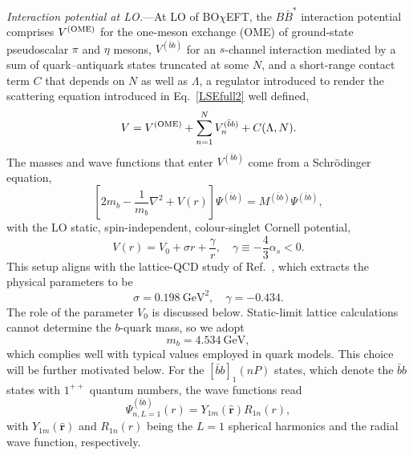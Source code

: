 \documentclass[aps,prl,showpacs,amsmath,twocolumn,superscriptaddress,floatfix,nofootinbib,notitlepage]{revtex4-2}
\newcommand{\bbnP}{[\bar{b}b]_1(nP)}
\newcommand{\psibb}{\Psi^{(\bar{b}b)}}
\newcommand{\Mbb}{M^{(\bar{b}b)}}
\newcommand{\ver}{{\bm r}}
\newcommand{\be}{\begin{equation}}
\newcommand{\ee}{\end{equation}}
\newcommand{\BOchiEFT}{BO$\chi$EFT\xspace}
\newcommand{\VQQ}{V^{(\bar{b}b)}}
\newcommand{\VOME}{V^{\rm (OME)}}
\begin{document}
{\it Interaction potential at LO.}---At LO of \BOchiEFT, the $B\bar{B}^*$ interaction potential comprises $\VOME$ for the one-meson exchange (OME) of ground-state pseudoscalar $\pi$ and $\eta$ mesons, $\VQQ$ for an $s$-channel interaction mediated by
a sum of quark--antiquark states truncated at some $N$, and a short-range contact term $C$ that depends on $N$ as well as $\Lambda$, a regulator introduced to render the scattering equation introduced in Eq.~\eqref{LSEfull2} well defined,
\be
V=\VOME+\sum_{n=1}^N \VQQ_n+C(\Lambda,N).
\label{Vdef}
\ee
The masses and wave functions that enter $\VQQ$ come from a Schr{\"o}dinger equation,
\be
\left[2m_b-\frac{1}{m_b}\nabla^{2}+V(r)\right]\psibb=\Mbb\psibb,
\label{Scheq}
\ee
with the LO static, spin-independent, colour-singlet Cornell potential,
\be
V(r)=
V_0+
\sigma r+\frac{\gamma}{r},\quad \gamma\equiv-\frac43\alpha_s<0.
\label{Cornell}
\ee
This setup aligns with the lattice-QCD study of Ref.~\cite{Bulava:2024jpj}, which extracts the physical parameters to be
\be
\sigma=0.198~\mbox{GeV}^2,\quad
\gamma=-0.434.
\label{eq:parameters}
\ee
The role of the parameter $V_0$ is discussed below. Static-limit lattice calculations cannot determine the $b$-quark mass, so we adopt
\be
m_b=4.534~\mbox{GeV},
\label{mb}
\ee
which complies well with typical values employed in quark models. This choice will be further motivated below.
For the $\bbnP$ states,
which denote the $\bar bb$ states with $1^{++}$
quantum numbers, the wave functions read
\be
\psibb_{n,L=1}(r)=Y_{1m}(\hat{\ver})R_{1n}(r),
\label{psi}
\ee
with $Y_{1m}(\hat{\ver})$ and $R_{1n}(r)$ being the $L=1$ spherical harmonics and the radial wave function, respectively.
\end{document}

